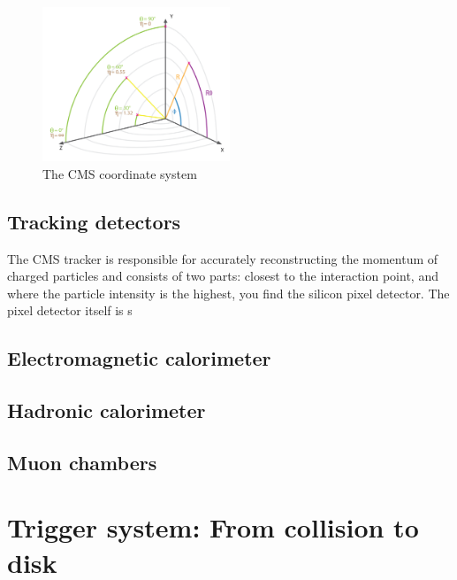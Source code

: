 \begin{figure}[h] 
    \centering
    \includegraphics[width=0.5\textwidth]{figures/cms/img_cms_coordinates.png}
    \caption{The CMS coordinate system~\cite{Lenzi:2013xpa}}
    \label{fig:cms:cooordinates}
\end{figure}


\subsection{Tracking detectors}
The CMS tracker is responsible for accurately reconstructing the momentum of charged particles and consists of two parts: closest to the interaction point, and where the particle intensity is the highest, you find the silicon pixel detector. The pixel detector itself is s

\subsection{Electromagnetic calorimeter}
\subsection{Hadronic calorimeter}
\subsection{Muon chambers}
\section{Trigger system: From collision to disk}
